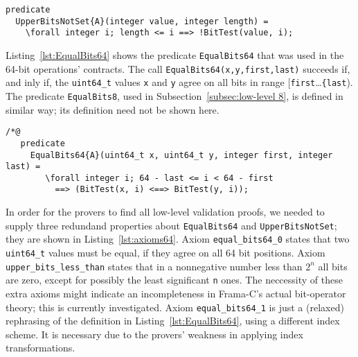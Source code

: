 \begin{listing}[hbt]
\begin{minipage}{0.99\textwidth}
\begin{lstlisting}[style=acsl-block]
predicate
  UpperBitsNotSet{A}(integer value, integer length) =
    \forall integer i; length <= i ==> !BitTest(value, i);
\end{lstlisting}
\end{minipage}
\caption{\label{lst:UpperBitsNotSet integer}
	Definition of the low-level predicate \lstinline{UpperBitsNotSet}}
\end{listing}


Listing~\ref{lst:EqualBits64} shows the predicate
\lstinline{EqualBits64} that was used in the 64-bit
operations' contracts.
%
The call \lstinline{EqualBits64(x,y,first,last)} succeeds if, and inly
if, the \lstinline{uint64_t} values  \lstinline{x} and  \lstinline{y}
agree on all bits in range [\lstinline{first}\ldots\lstinline{{last}).
%
The predicate \lstinline{EqualBits8}, used in
Subsection~\ref{subsec:low-level 8}, is defined in similar way; its
definition need not be shown here.










\begin{listing}[hbt]
\begin{minipage}{0.99\textwidth}
\begin{lstlisting}[style=acsl-block]
/*@
   predicate
     EqualBits64{A}(uint64_t x, uint64_t y, integer first, integer last) =
        \forall integer i; 64 - last <= i < 64 - first 
          ==> (BitTest(x, i) <==> BitTest(y, i));
\end{lstlisting}
\end{minipage}
\caption{\label{lst:EqualBits64}
        Definition of the low-level predicate \lstinline{EqualBits64}}
\end{listing}








In order for the provers to find all low-level validation proofs, we
needed to supply three redundand properties about
\lstinline{EqualBits64} and \lstinline{UpperBitsNotSet}; they are shown
in Listing~\ref{lst:axioms64}.
%
Axiom \lstinline{equal_bits64_0} states that two \lstinline{uint64_t}
values must be equal, if they agree on all 64 bit positions.
%
Axiom \lstinline{upper_bits_less_than} states that in a nonnegative number
less than $2^n$ all bits are zero, except for possibly
the least significant \lstinline{n} ones.
%
The neccessity of these extra axioms might indicate an
incompleteness in Frama-C's actual bit-operator theory; this is currently
investigated.
%
Axiom \lstinline{equal_bits64_1} is just a (relaxed)
rephrasing of the definition
in Listing~\ref{lst:EqualBits64}, using a different index scheme.
%
It is necessary due to the provers' weakness in applying index
transformations.










